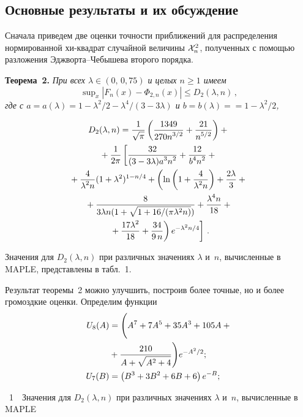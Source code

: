 \begin{multicols}{2}
\section{Основные результаты и их обсуждение}

Сначала приведем две оценки точности приближений для распределения нормированной хи-квад\-рат 
случайной величины ${\cal X}_n^2$, полученных с помощью разложения Эджворта--Чебышева второго порядка.

\medskip

\noindent
\textbf{Теорема~2.} \textit{При всех $\lambda \in (0,\,0{,}75)$  и целых $n\geq 1$ имеем
$$
\sup\nolimits_x \left\vert F_n(x) - \Phi_{2,n}(x)\right\vert \leq D_2(\lambda, n)\,, 
$$
где с $a=a(\lambda)=1-\lambda^2/2-\lambda^4/(3-3\lambda)$ и $b=b(\lambda)=$\linebreak $=1-\lambda^2/2$,}

\noindent
\begin{multline*}
D_2(\lambda, n)  = \fr{1}{\sqrt{\pi}}\left(\fr{1349}{270n^{3/2}}+\fr{21}{n^{5/2}}\right)+{}\\
{}+
\fr{1}{2\pi}\left[\fr{32}{(3-3\lambda)a^3n^2} +\fr{12}{b^4n^2}+{}\right.\\
\left. {}+\fr{4}{\lambda^2n} (1+\lambda^2)^{1-n/4}+
\left( \ln\left(1+\fr{4}{\lambda^2n}\right)+ \fr{2\lambda}{3}+{}\right.\right.\\
\left. \left.{}+\fr{8}{3\lambda n(1+\sqrt{1+16/(\pi \lambda^2 n)})}
+\fr{\lambda^4 n}{18}+{}\right.\right.\\
\left. \left. {}+ \fr{17\lambda^2}{18} +\fr{34}{9\,n}\right)e^{-\lambda^2 n/4}\right]
\,.
\end{multline*}



Значения для $D_2(\lambda,n)$ при различных значениях  $\lambda$ и~$n$, вычисленные в    MAPLE,
представлены в табл.~1.

Результат теоремы~2 можно улучшить, построив более точные, но и более громоздкие оценки. Определим функции
\begin{align*}
  U_8(A)&= \Bigg(A^7+7A^5+35A^3+ 105A + {}\\
&{}+\fr{210}{A+\sqrt{A^2+4}}\Bigg)e^{-A^2/2};\\
  U_7(B)&= \left(B^3+3B^2+6B+6\right)e^{-B};
\end{align*}


  \noindent
\begin{center} %
\parbox{56mm}{{\tablename~1}\ \ \small{Значения для $D_2(\lambda,n)$ 
при различных значениях  $\lambda$ и~$n$, вычисленные в    MAPLE}}


\end{center}
\end{multicols}
